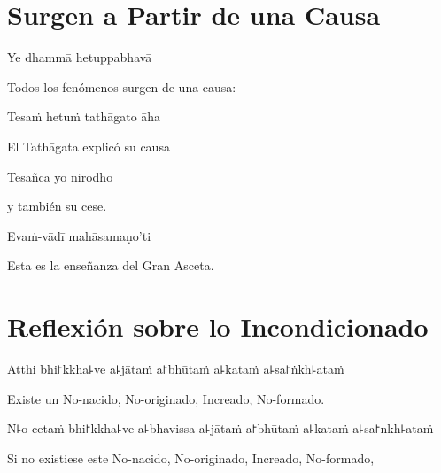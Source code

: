 \chapter{Surgen a Partir de una Causa}


\begin{leader}
\end{leader}

Ye dhammā hetuppabhavā

\begin{english}
  Todos los fenómenos surgen de una causa:
\end{english}

Tesaṁ hetuṁ tathāgato āha

\begin{english}
  El Tathāgata explicó su causa
\end{english}

Tesañca yo nirodho

\begin{english}
  y también su cese.
\end{english}

Evaṁ-vādī mahāsamaṇo'ti

\begin{english}
  Esta es la enseñanza del Gran Asceta.
\end{english}


\chapter[Incondicionado]{Reflexión sobre lo Incondicionado}


\begin{leader}
\end{leader}

Atthi bhi꜓kkha꜕ve a꜕jātaṁ a꜓bhūtaṁ a꜕kataṁ a꜕sa꜓ṅkh꜕ataṁ

\begin{english}
  Existe un No-nacido, No-originado, Increado, No-formado.
\end{english}

N꜕o cetaṁ bhi꜓kkha꜕ve a꜕bhavissa a꜕jātaṁ a꜓bhūtaṁ a꜕kataṁ a꜕sa꜓nkh꜕ataṁ

\begin{english}
 Si no existiese este No-nacido, No-originado, Increado, No-formado,
\end{english}

